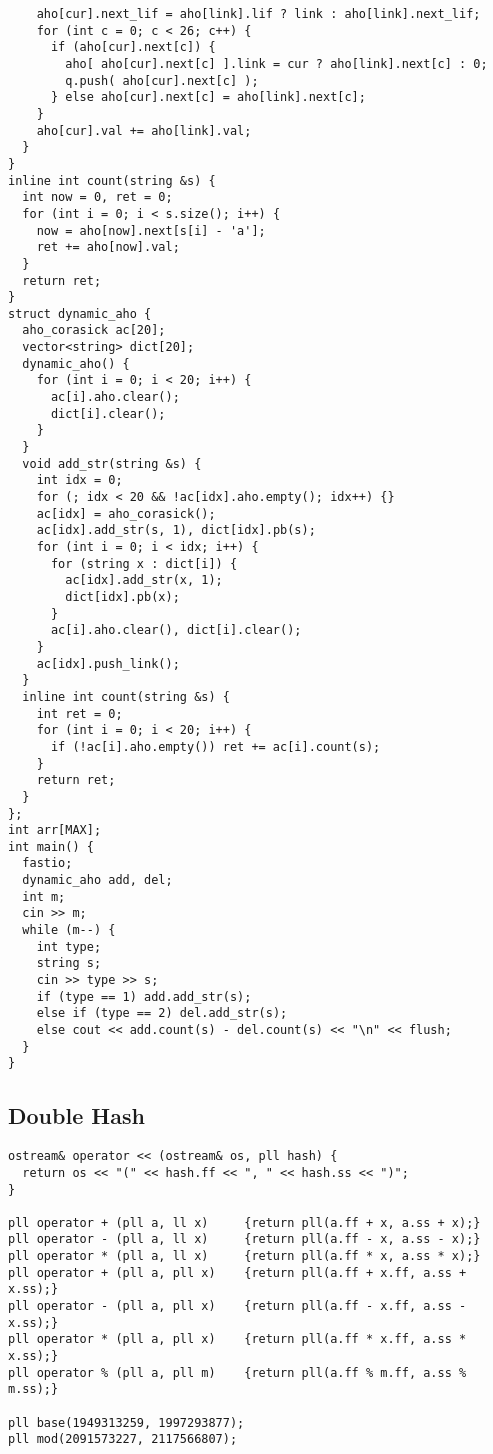 \documentclass[10pt,a4paper,onesided]{article}
\begin{document}
\begin{multicols*}{3}
\begin{lstlisting}
    aho[cur].next_lif = aho[link].lif ? link : aho[link].next_lif;
    for (int c = 0; c < 26; c++) {
      if (aho[cur].next[c]) {
        aho[ aho[cur].next[c] ].link = cur ? aho[link].next[c] : 0;
        q.push( aho[cur].next[c] );
      } else aho[cur].next[c] = aho[link].next[c];
    }
    aho[cur].val += aho[link].val;
  }
}
inline int count(string &s) {
  int now = 0, ret = 0;
  for (int i = 0; i < s.size(); i++) {
    now = aho[now].next[s[i] - 'a'];
    ret += aho[now].val;
  }
  return ret;
}
struct dynamic_aho {
  aho_corasick ac[20];
  vector<string> dict[20];
  dynamic_aho() {
    for (int i = 0; i < 20; i++) {
      ac[i].aho.clear();
      dict[i].clear();
    }
  }
  void add_str(string &s) {
    int idx = 0;
    for (; idx < 20 && !ac[idx].aho.empty(); idx++) {}
    ac[idx] = aho_corasick();
    ac[idx].add_str(s, 1), dict[idx].pb(s);
    for (int i = 0; i < idx; i++) {
      for (string x : dict[i]) {
        ac[idx].add_str(x, 1);
        dict[idx].pb(x);
      }
      ac[i].aho.clear(), dict[i].clear();
    }
    ac[idx].push_link();
  }
  inline int count(string &s) {
    int ret = 0;
    for (int i = 0; i < 20; i++) {
      if (!ac[i].aho.empty()) ret += ac[i].count(s);
    }
    return ret;
  }
};
int arr[MAX];
int main() {
  fastio;
  dynamic_aho add, del;
  int m;
  cin >> m;
  while (m--) {
    int type;
    string s;
    cin >> type >> s;
    if (type == 1) add.add_str(s);
    else if (type == 2) del.add_str(s);
    else cout << add.count(s) - del.count(s) << "\n" << flush;
  }
}
\end{lstlisting}
\subsection{Double Hash}
\begin{lstlisting}
ostream& operator << (ostream& os, pll hash) {
  return os << "(" << hash.ff << ", " << hash.ss << ")";
}

pll operator + (pll a, ll x)     {return pll(a.ff + x, a.ss + x);}
pll operator - (pll a, ll x)     {return pll(a.ff - x, a.ss - x);}
pll operator * (pll a, ll x)     {return pll(a.ff * x, a.ss * x);}
pll operator + (pll a, pll x)    {return pll(a.ff + x.ff, a.ss + x.ss);}
pll operator - (pll a, pll x)    {return pll(a.ff - x.ff, a.ss - x.ss);}
pll operator * (pll a, pll x)    {return pll(a.ff * x.ff, a.ss * x.ss);}
pll operator % (pll a, pll m)    {return pll(a.ff % m.ff, a.ss % m.ss);}

pll base(1949313259, 1997293877);
pll mod(2091573227, 2117566807);


\end{lstlisting}
\end{multicols*}
\end{document}

